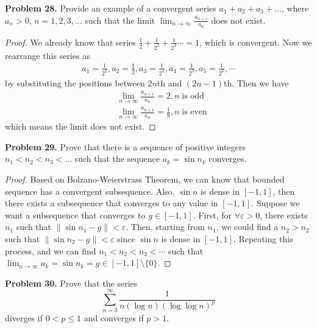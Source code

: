 \documentclass[12pt,leqno]{amsart}
\begin{document}
\medskip

\noindent
{\bf Problem 28.}
Provide an example of a convergent series
$a_1+a_2+a_3+\ldots$, where $a_n>0$, $n=1,2,3,\ldots$ such that
the limit $\lim_{n\to\infty} \frac{a_{n+1}}{a_n}$ does not exist.

\begin{proof}
We already know that series $\frac{1}{2} + \frac{1}{2^2} + \frac{1}{2^3} \cdots = 1$, which is convergent. Now we rearrange this series as
\begin{align*}
    a_1 = \frac{1}{2^2}, a_2 = \frac{1}{2}, a_3 = \frac{1}{2^4}, a_4 = \frac{1}{2^3}, a_5 = \frac{1}{2^6}, \cdots
\end{align*}
by substituting the positions between $2n$th and $(2n-1)$th. Then we have 
\begin{align*}
    & \lim_{n\to\infty} \frac{a_{n+1}}{a_n} = 2, n\;\text{is odd} \\
    & \lim_{n\to\infty} \frac{a_{n+1}}{a_n} = \frac{1}{8}, n\;\text{is even}
\end{align*}
which means the limit does not exist.
\end{proof}

\medskip

\noindent
{\bf Problem 29.}
Prove that there is a sequence of positive integers
$n_1<n_2< n_3 <\ldots$ such that the sequence
$a_k=\sin n_k$ converges.

\begin{proof}
Based on Bolzano-Weierstrass Theorem, we can know that bounded sequence has a convergent subsequence. Also, $\sin n$ is dense in $[-1,1]$, then there exists a subsequence that converges to any value in $[-1,1]$. Suppose we want a subsequence that converges to $g \in [-1,1]$. First, for $\forall \varepsilon > 0$, there exists $n_1$ such that $\| \sin n_1 - g\| < \varepsilon$. Then, starting from $n_1$, we could find a $n_2 > n_2$ such that  $\| \sin n_2 - g\| < \varepsilon$ since $\sin n$ is dense in $[-1,1]$. Repeating this process, and we can find $n_1 < n_2 < n_3 < \cdots$ such that $\lim_{n\to\infty} a_k = \sin n_k = g \in [-1,1]\setminus \{0\}$.
\end{proof}

\medskip



\noindent
{\bf Problem 30.}
Prove that the series
$$
\sum_{n=3}^\infty
\frac{1}{n (\log n) (\log \log n)^p}
$$
diverges if $0<p\leq 1$ and converges if $p>1$.
\end{document}
